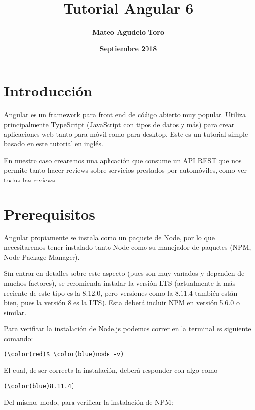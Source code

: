 \documentclass{article}
\title{\textbf{Tutorial Angular 6}}
\author{\textbf{Mateo Agudelo Toro}}
\date{\textbf{Septiembre 2018}}
\begin{document}
\maketitle


\section{Introducci\'on}
Angular es un framework para front end de c\'odigo abierto muy popular. Utiliza principalmente TypeScript (JavaScript con tipos de datos y m\'as) para crear aplicaciones web tanto para m\'ovil como para desktop. Este es un tutorial simple basado en \href{https://coursetro.com/posts/code/154/Angular-6-Tutorial---Learn-Angular-6-in-this-Crash-Course}{este tutorial en ingl\'es}.

En nuestro caso crearemos una aplicaci\'on que consume un API REST que nos permite tanto hacer reviews sobre servicios prestados por autom\'oviles, como ver todas las reviews.


\section{Prerequisitos}
Angular propiamente se instala como un paquete de Node, por lo que necesitaremos tener instalado tanto Node como su manejador de paquetes (NPM, Node Package Manager).

Sin entrar en detalles sobre este aspecto (pues son muy variados y dependen de muchos factores), se recomienda instalar la versi\'on LTS (actualmente la m\'as reciente de este tipo es la 8.12.0, pero versiones como la 8.11.4 tambi\'en est\'an bien, pues la versi\'on 8 es la LTS). Esta deber\'a incluir NPM en versi\'on 5.6.0 o similar.

Para verificar la instalaci\'on de Node.js podemos correr en la terminal es siguiente comando:

\begin{Verbatim}[fontsize=\small,commandchars=\\\(\)]
    (\color(red)$ \color(blue)node -v)
\end{Verbatim}

El cual, de ser correcta la instalaci\'on, deber\'a responder con algo como 

\begin{Verbatim}[fontsize=\small,commandchars=\\\(\)]
    (\color(blue)8.11.4)
\end{Verbatim}

Del mismo, modo, para verificar la instalaci\'on de NPM:
\end{document}
